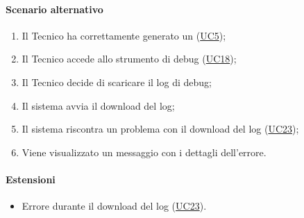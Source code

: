 \paragraph*{Scenario alternativo}
\begin{enumerate}
  \item Il Tecnico ha correttamente generato un  (\hyperref[UC5]{UC5});
  \item Il Tecnico accede allo strumento di debug (\hyperref[UC18]{UC18});
  \item Il Tecnico decide di scaricare il log di debug;
  \item Il sistema avvia il download del log;
  \item Il sistema riscontra un problema con il download del log (\hyperref[UC23]{UC23});
  \item Viene visualizzato un messaggio con i dettagli dell'errore.
\end{enumerate}

\paragraph*{Estensioni}
\begin{itemize}
  \item Errore durante il download del log (\hyperref[UC23]{UC23}).
\end{itemize}